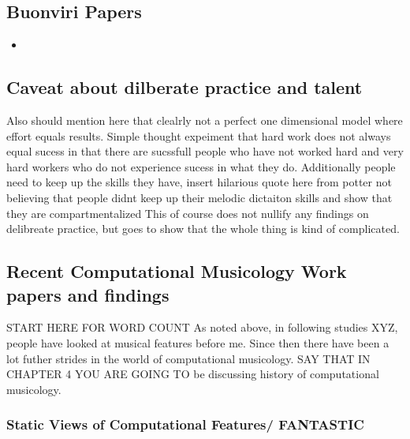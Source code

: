 \documentclass[]{book}
\providecommand{\tightlist}{%
  \setlength{\itemsep}{0pt}\setlength{\parskip}{0pt}}
\theoremstyle{definition}
\theoremstyle{definition}
\theoremstyle{definition}
\theoremstyle{remark}
\begin{document}
\hypertarget{buonviri-papers}{%
\subsection{Buonviri Papers}\label{buonviri-papers}}

\begin{itemize}
\tightlist
\item
  \citep{buonviriEffectsMusicNotation2015, buonviriEffectsPreparatorySinging2015, buonviriEffectsTwoListening2017, buonviriExplorationUndergraduateMusic2014, buonviriMelodicDictationInstruction2015, paneyTeachingMelodicDictation2014}
\end{itemize}

\hypertarget{caveat-about-dilberate-practice-and-talent}{%
\subsection{Caveat about dilberate practice and
talent}\label{caveat-about-dilberate-practice-and-talent}}

Also should mention here that clealrly not a perfect one dimensional
model where effort equals results. Simple thought expeiment that hard
work does not always equal sucess in that there are sucssfull people who
have not worked hard and very hard workers who do not experience sucess
in what they do. Additionally people need to keep up the skills they
have, insert hilarious quote here from potter not believing that people
didnt keep up their melodic dictaiton skills and show that they are
compartmentalized \citep{potterIdentifyingSucessfulDictation1990} This
of course does not nullify any findings on delibreate practice, but goes
to show that the whole thing is kind of complicated.

\hypertarget{recent-computational-musicology-work-papers-and-findings}{%
\subsection{Recent Computational Musicology Work papers and
findings}\label{recent-computational-musicology-work-papers-and-findings}}

START HERE FOR WORD COUNT As noted above, in following studies XYZ,
people have looked at musical features before me. Since then there have
been a lot futher strides in the world of computational musicology. SAY
THAT IN CHAPTER 4 YOU ARE GOING TO be discussing history of
computational musicology.

\hypertarget{static-views-of-computational-features-fantastic}{%
\subsubsection{Static Views of Computational Features/
FANTASTIC}\label{static-views-of-computational-features-fantastic}}
\end{document}
